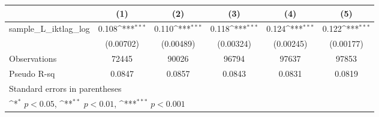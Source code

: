 {
\def\sym#1{\ifmmode^{#1}\else\(^{#1}\)\fi}
\begin{tabular}{l*{5}{c}}
\hline\hline
                &\multicolumn{1}{c}{(1)}         &\multicolumn{1}{c}{(2)}         &\multicolumn{1}{c}{(3)}         &\multicolumn{1}{c}{(4)}         &\multicolumn{1}{c}{(5)}         \\
\hline
sample\_L\_iktlag\_log&    0.108\sym{***}&    0.110\sym{***}&    0.118\sym{***}&    0.124\sym{***}&    0.122\sym{***}\\
                &(0.00702)         &(0.00489)         &(0.00324)         &(0.00245)         &(0.00177)         \\
\hline
Observations    &    72445         &    90026         &    96794         &    97637         &    97853         \\
Pseudo R-sq     &   0.0847         &   0.0857         &   0.0843         &   0.0831         &   0.0819         \\
\hline\hline
\multicolumn{6}{l}{\footnotesize Standard errors in parentheses}\\
\multicolumn{6}{l}{\footnotesize \sym{*} \(p<0.05\), \sym{**} \(p<0.01\), \sym{***} \(p<0.001\)}\\
\end{tabular}
}

